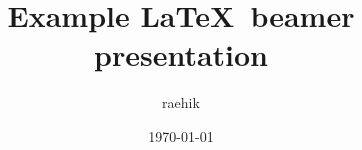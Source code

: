 \newcommand{\addcfg}[1]{}
\newcommand{\addsrc}[1]{} %

\addcfg{preamble-beamer}

\title{Example \LaTeX\ beamer presentation}
\author{raehik}
\date{\today}



\addsrc{intro}
\addsrc{features}
\ifXeTeX
    \addsrc{xetex-jp}
\fi


